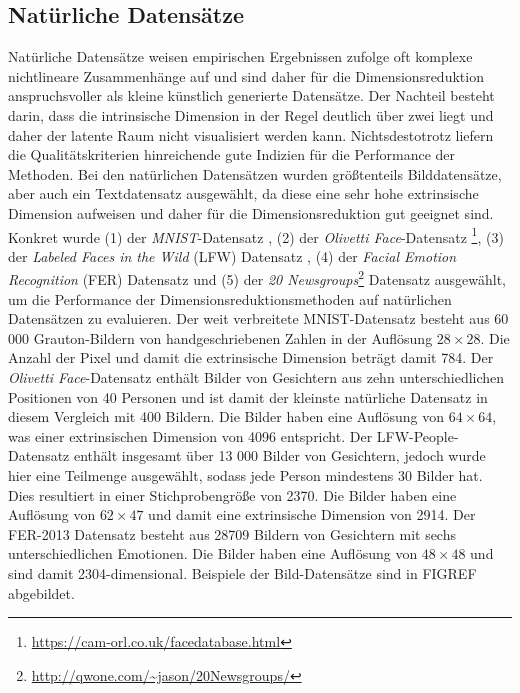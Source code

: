 \subsection{Natürliche Datensätze}
\label{ch:Vergleich:sec:VerwendeteDatensaetze:natuerlich}
Natürliche
Datensätze weisen empirischen Ergebnissen zufolge \addref oft komplexe nichtlineare Zusammenhänge
auf und sind daher für die Dimensionsreduktion anspruchsvoller als kleine künstlich generierte
Datensätze. Der Nachteil besteht darin, dass die intrinsische Dimension in der Regel deutlich über
zwei liegt und daher der latente Raum nicht visualisiert werden kann. Nichtsdestotrotz liefern die
Qualitätskriterien hinreichende gute Indizien für die Performance der Methoden. Bei den natürlichen
Datensätzen wurden größtenteils Bilddatensätze, aber auch ein Textdatensatz ausgewählt, da diese eine
sehr hohe extrinsische Dimension aufweisen und daher für die Dimensionsreduktion gut geeignet sind.
Konkret wurde (1) der \textit{MNIST}-Datensatz \parencite{LeCun.2010}, (2) der \textit{Olivetti Face}-Datensatz
\footnote{\url{https://cam-orl.co.uk/facedatabase.html}}, (3) der \textit{Labeled Faces in the
	Wild} (LFW) Datensatz \parencite{GaryB.Huang.2007}, (4) der \textit{Facial Emotion Recognition} (FER) Datensatz \parencite{DumitruIanGoodfellowWillCukierskiYoshuaBengio.2013} und (5) der \textit{20
	Newsgroups}\footnote{\url{http://qwone.com/~jason/20Newsgroups/}} Datensatz ausgewählt, um die
Performance der Dimensionsreduktionsmethoden auf natürlichen Datensätzen zu evaluieren. Der weit
verbreitete MNIST-Datensatz besteht aus 60 000 Grauton-Bildern von handgeschriebenen Zahlen in der
Auflösung $28 \times 28$. Die Anzahl der Pixel und damit die extrinsische Dimension beträgt damit
784. Der \textit{Olivetti Face}-Datensatz enthält Bilder von Gesichtern aus zehn unterschiedlichen
Positionen von 40 Personen und ist damit der kleinste natürliche Datensatz in diesem Vergleich mit
400 Bildern. Die Bilder haben eine Auflösung von $64 \times 64$, was einer extrinsischen Dimension
von 4096 entspricht. Der LFW-People-Datensatz enthält insgesamt über 13 000 Bilder von Gesichtern,
jedoch wurde hier eine Teilmenge ausgewählt, sodass jede Person mindestens 30 Bilder hat. Dies
resultiert in einer Stichprobengröße von 2370. Die Bilder haben eine Auflösung von $62 \times 47$
und damit eine extrinsische Dimension von 2914. Der FER-2013 Datensatz besteht aus 28709 Bildern
von Gesichtern mit sechs unterschiedlichen Emotionen. Die Bilder haben eine Auflösung von $48
	\times 48$ und sind damit 2304-dimensional. Beispiele der Bild-Datensätze sind in FIGREF
 abgebildet.

